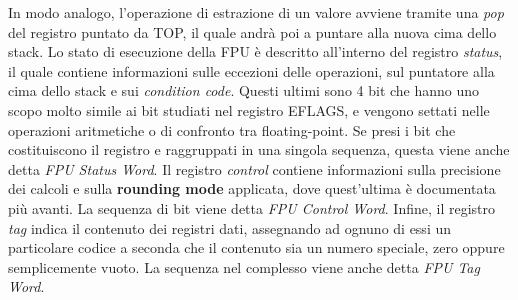 \documentclass[Lau, oneside]{sapthesis}%
\begin{document}
In modo analogo, l'operazione di estrazione di un valore avviene tramite una \textit{pop} del registro puntato da TOP, il quale andrà poi a puntare alla nuova cima dello stack. 
\newline \newline
Lo stato di esecuzione della FPU è descritto all'interno del registro \textit{status}, il quale contiene informazioni sulle eccezioni delle operazioni, sul puntatore alla cima dello stack e sui \textit{condition code}.
\newline
Questi ultimi sono 4 bit che hanno uno scopo molto simile ai bit studiati nel registro EFLAGS, e vengono settati nelle operazioni aritmetiche o di confronto tra floating-point.
\newline
Se presi i bit che costituiscono il registro e raggruppati in una singola sequenza, questa viene anche detta \textit{FPU Status Word}.
\newline \newline
Il registro \textit{control} contiene informazioni sulla precisione dei calcoli e sulla \textbf{rounding mode} applicata, dove quest'ultima è documentata più avanti.
\newline
La sequenza di bit viene detta \textit{FPU Control Word}.
\newline \newline
Infine, il registro \textit{tag} indica il contenuto dei registri dati, assegnando ad ognuno di essi un particolare codice a seconda che il contenuto sia un numero speciale, zero oppure semplicemente vuoto.
\newline
La sequenza nel complesso viene anche detta \textit{FPU Tag Word}.
\end{document}
